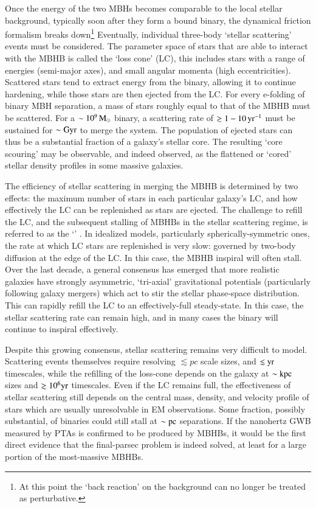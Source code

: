 \documentclass[onecolumn,authoryear]{els-mrw}
\begin{document}
Once the energy of the two MBHs becomes comparable to the local stellar background, typically soon after they form a bound binary, the dynamical friction formalism breaks down\footnote{At this point the `back reaction' on the background can no longer be treated as perturbative.}  Eventually, individual three-body `stellar scattering' events must be considered.  The parameter space of stars that are able to interact with the MBHB is called the `loss cone' (LC), this includes stars with a range of energies (semi-major axes), and small angular momenta (high eccentricities).  Scattered stars tend to extract energy from the binary, allowing it to continue hardening, while those stars are then ejected from the LC.  For every e-folding of binary MBH separation, a mass of stars roughly equal to that of the MBHB must be scattered.  For a $\sim 10^9 \, \textrm{M}_{\odot}$ binary, a scattering rate of $\gtrsim 1 - 10 \, \mathrm{yr}^{-1}$ must be sustained for $\sim \textrm{Gyr}$ to merge the system.  The population of ejected stars can thus be a substantial fraction of a galaxy's stellar core.  The resulting `core scouring' may be observable, and indeed observed, as the flattened or `cored' stellar density profiles in some massive galaxies.

The efficiency of stellar scattering in merging the MBHB is determined by two effects: the maximum number of stars in each particular galaxy's LC, and how effectively the LC can be replenished as stars are ejected.  The challenge to refill the LC, and the subsequent stalling of MBHBs in the stellar scattering regime, is referred to as the `' \citep{Milosavljevic+Merritt-2003}.  In idealized models, particularly spherically-symmetric ones, the rate at which LC stars are replenished is very slow: governed by two-body diffusion at the edge of the LC.  In this case, the MBHB inspiral will often stall.  Over the last decade, a general consensus has emerged that more realistic galaxies have strongly asymmetric, `tri-axial' gravitational potentials (particularly following galaxy mergers) which act to stir the stellar phase-space distribution.  This can rapidly refill the LC to an effectively-full steady-state.  In this case, the stellar scattering rate can remain high, and in many cases the binary will continue to inspiral effectively.

Despite this growing consensus, stellar scattering remains very difficult to model.  Scattering events themselves require resolving $\lesssim pc$ scale sizes, and $\lesssim \mathrm{yr}$ timescales, while the refilling of the loss-cone depends on the galaxy at $\sim \mathrm{kpc}$ sizes and $\gtrsim 10^6 \mathrm{yr}$ timescales.  Even if the LC remains full, the effectiveness of stellar scattering still depends on the central mass, density, and velocity profile of stars which are usually unresolvable in EM observations.  Some fraction, possibly substantial, of binaries could still stall at $\sim \mathrm{pc}$ separations.  If the nanohertz GWB measured by PTAs is confirmed to be produced by MBHBs, it would be the first direct evidence that the final-parsec problem is indeed solved, at least for a large portion of the most-massive MBHBs.
\end{document}
